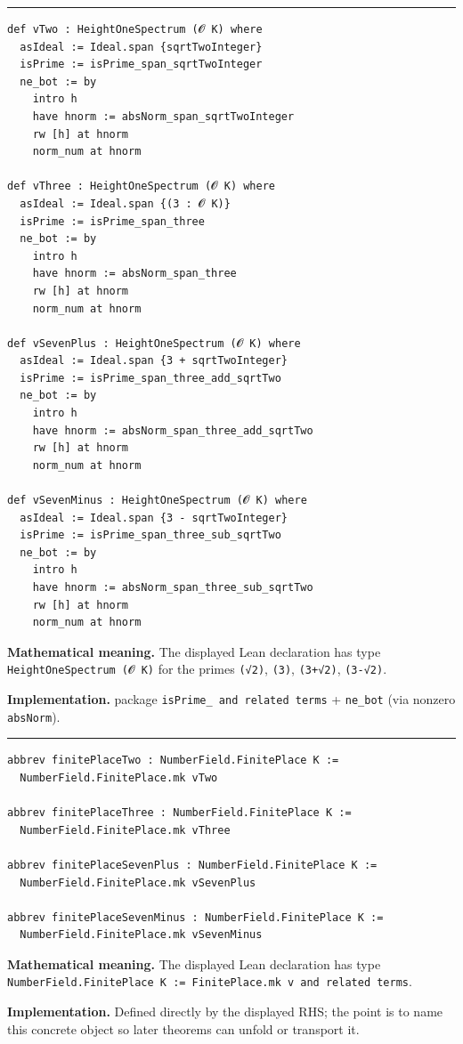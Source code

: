 \documentclass[UTF8,a4paper,11pt,fontset=fandol]{ctexart}
\theoremstyle{definition}
\newcommand{\statementsep}{\par\medskip\hrule\medskip}
\begin{document}
\statementsep
\begin{verbatim}
def vTwo : HeightOneSpectrum (𝓞 K) where
  asIdeal := Ideal.span {sqrtTwoInteger}
  isPrime := isPrime_span_sqrtTwoInteger
  ne_bot := by
    intro h
    have hnorm := absNorm_span_sqrtTwoInteger
    rw [h] at hnorm
    norm_num at hnorm

def vThree : HeightOneSpectrum (𝓞 K) where
  asIdeal := Ideal.span {(3 : 𝓞 K)}
  isPrime := isPrime_span_three
  ne_bot := by
    intro h
    have hnorm := absNorm_span_three
    rw [h] at hnorm
    norm_num at hnorm

def vSevenPlus : HeightOneSpectrum (𝓞 K) where
  asIdeal := Ideal.span {3 + sqrtTwoInteger}
  isPrime := isPrime_span_three_add_sqrtTwo
  ne_bot := by
    intro h
    have hnorm := absNorm_span_three_add_sqrtTwo
    rw [h] at hnorm
    norm_num at hnorm

def vSevenMinus : HeightOneSpectrum (𝓞 K) where
  asIdeal := Ideal.span {3 - sqrtTwoInteger}
  isPrime := isPrime_span_three_sub_sqrtTwo
  ne_bot := by
    intro h
    have hnorm := absNorm_span_three_sub_sqrtTwo
    rw [h] at hnorm
    norm_num at hnorm
\end{verbatim}
\noindent\textbf{Mathematical meaning.} The displayed Lean declaration has type \texttt{HeightOneSpectrum (𝓞 K)} for the primes \texttt{(√2)}, \texttt{(3)}, \texttt{(3+√2)}, \texttt{(3-√2)}.\par
\noindent\textbf{Implementation.} package \texttt{isPrime\_\allowbreak{} and related terms} + \texttt{ne\_\allowbreak{}bot} (via nonzero \texttt{absNorm}).\par
\statementsep
\begin{verbatim}
abbrev finitePlaceTwo : NumberField.FinitePlace K :=
  NumberField.FinitePlace.mk vTwo

abbrev finitePlaceThree : NumberField.FinitePlace K :=
  NumberField.FinitePlace.mk vThree

abbrev finitePlaceSevenPlus : NumberField.FinitePlace K :=
  NumberField.FinitePlace.mk vSevenPlus

abbrev finitePlaceSevenMinus : NumberField.FinitePlace K :=
  NumberField.FinitePlace.mk vSevenMinus
\end{verbatim}
\noindent\textbf{Mathematical meaning.} The displayed Lean declaration has type \texttt{NumberField.\allowbreak{}FinitePlace K := FinitePlace.\allowbreak{}mk v and related terms}.\par
\noindent\textbf{Implementation.} Defined directly by the displayed RHS; the point is to name this concrete object so later theorems can unfold or transport it.\par
\end{document}

